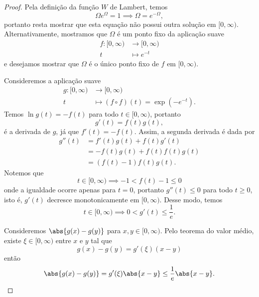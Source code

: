 \begin{proof}
    Pela definição da função \(W\) de Lambert, temos
    \begin{equation*}
        \Omega e^\Omega = 1 \implies \Omega = e^{-\Omega},
    \end{equation*}
    portanto resta mostrar que esta equação não possui outra solução em \([0,\infty)\). Alternativamente, mostramos que \(\Omega\) é um ponto fixo da aplicação suave
    \begin{align*}
        f : [0, \infty) &\to [0, \infty)\\
                      t &\mapsto e^{-t}
    \end{align*}
    e desejamos mostrar que \(\Omega\) é o único ponto fixo de \(f\) em \([0,\infty)\).

    Consideremos a aplicação suave
    \begin{align*}
        g : [0, \infty) &\to [0,\infty)\\
                      t &\mapsto (f\circ f)(t) = \exp{\left(-e^{-t}\right)}.
    \end{align*}
    Temos \(\ln{g(t)} = -f(t)\) para todo \(t \in [0,\infty)\), portanto
    \begin{equation*}
        g'(t) = f(t) g(t),
    \end{equation*}
    é a derivada de \(g\), já que \(f'(t) = -f(t)\). Assim, a segunda derivada é dada por
    \begin{align*}
        g''(t) &= f'(t)g(t) + f(t)g'(t)\\
               &= -f(t) g(t) + f(t) f(t) g(t)\\
               &= \left(f(t) - 1\right) f(t) g(t).
    \end{align*}
    Notemos que
    \begin{equation*}
        t \in [0, \infty) \implies -1 < f(t) - 1 \leq 0
    \end{equation*}
    onde a igualdade ocorre apenas para \(t = 0\), portanto \(g''(t) \leq 0\) para todo \(t \geq 0\), isto é, \(g'(t)\) decresce monotonicamente em \([0, \infty)\). Desse modo, temos
    \begin{equation*}
        t \in [0, \infty) \implies 0 < g'(t) \leq \frac1e.
    \end{equation*}

    Consideremos \(\abs{g(x) - g(y)}\) para \(x,y \in [0,\infty)\). Pelo teorema do valor médio, existe \(\xi \in [0, \infty)\) entre \(x\) e \(y\) tal que
    \begin{equation*}
        g(x) - g(y) = g'(\xi) (x-y)
    \end{equation*}
    então
    \begin{equation*}
        \abs{g(x) - g(y)} = g'(\xi)\abs{x - y} \leq \frac1e \abs{x - y}.
    \end{equation*}


\end{proof}
